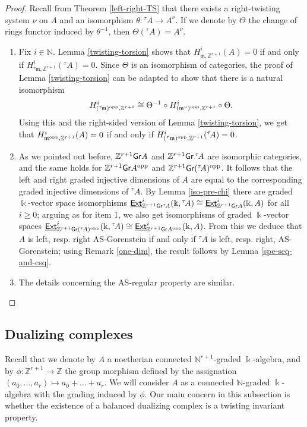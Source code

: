 \documentclass[twoside,11pt]{article}
\renewcommand{\k}{\Bbbk}
\newcommand{\N}{{\mathbb N}}
\newcommand{\Z}{{\mathbb Z}}
\newcommand{\m}{{\mathfrak m}}
\newcommand{\GrMod}{{\sf Gr}}
\newcommand{\EXT}{\underline{\sf Ext}}
\newcommand{\opp}{{\rm opp}}
\begin{document}
\begin{proof} 
Recall from Theorem \ref{left-right-TS} that there exists a right-twisting system $\nu$
on $A$ and an isomorphism $\theta: {}^\tau A \to A^\nu$. If we denote by $\Theta$ the
change of rings functor induced by $\theta^{-1}$, then $\Theta({}^\tau A) = A^\nu$.
\begin{enumerate}
\item Fix $i\in\N$. Lemma \ref{twisting-torsion} shows that $H_{\m,\Z^{r+1}}^i(A)=0$ if
and only if $H_{{}^\tau \m,\Z^{r+1}}^i({}^\tau\!A)=0$. Since $\Theta$ is an isomorphism of
categories, the proof of Lemma \ref{twisting-torsion} can be adapted to show that there is
a natural isomorphism \[H_{({}^\tau\!\m)^\opp,\Z^{r+1}}^i \cong \Theta^{-1} \circ
H_{(\m^{\nu})^\opp,\Z^{r+1}}^i \circ \Theta.\] Using this and the right-sided version of
Lemma \ref{twisting-torsion}, we get that $H_{\m^\opp,\Z^{r+1}}^i(A)=0$ if and only if
$H_{({}^\tau\m)^\opp,\Z^{r+1}}^i({}^\tau\!A)=0$. 

\item As we pointed out before, $\Z^{r+1}\GrMod A$ and $\Z^{r+1}\GrMod \,{}^\tau\!A$
are isomorphic categories, and the same holds for $\Z^{r+1}\GrMod A^\opp$ and
$\Z^{r+1}\GrMod ({}^\tau\!A)^\opp$. It follows that the left and right graded injective
dimensions of $A$ are equal to the corresponding graded injective dimensions of ${}^\tau
A$. By Lemma \ref{iso-pre-chi} there are graded $\k$-vector space isomorphisms
$\EXT^i_{\Z^{r+1}\GrMod{}^\tau\! A}(\k,{}^\tau\! A) \cong \EXT^i_{\Z^{r+1}\GrMod A}(\k,A)$
for all $i \geq 0$; arguing as for item 1, we also get isomorphisms of graded $\k$-vector
spaces $\EXT^i_{\Z^{r+1}\GrMod ({}^\tau\! A)^\opp}(\k,{}^\tau\! A) \cong
\EXT^i_{\Z^{r+1}\GrMod A^\opp}(\k,A)$. From this we deduce that $A$ is left, resp. right
AS-Gorenstein if and only if ${}^\tau A$ is left, resp. right, AS-Gorenstein; using Remark
\ref{one-dim}, the result follows by Lemma \ref{spe-seq-and-csq}.

\item The details concerning the AS-regular property are similar. \qedhere
\end{enumerate}
\end{proof}

\subsection{Dualizing complexes} \label{dc}
Recall that we denote by $A$ a noetherian connected $\N^{r+1}$-graded $\k$-algebra, and by
$\phi: \Z^{r+1} \to \Z$ the group morphism defined by the assignation $(a_0, \ldots, a_r)
\mapsto a_0 + \ldots + a_r$. We will consider $A$ as a connected $\N$-graded $\k$-algebra
with the grading induced by $\phi$. Our main concern in this subsection is
whether the existence of a balanced dualizing complex is a twisting invariant property.
\end{document}
